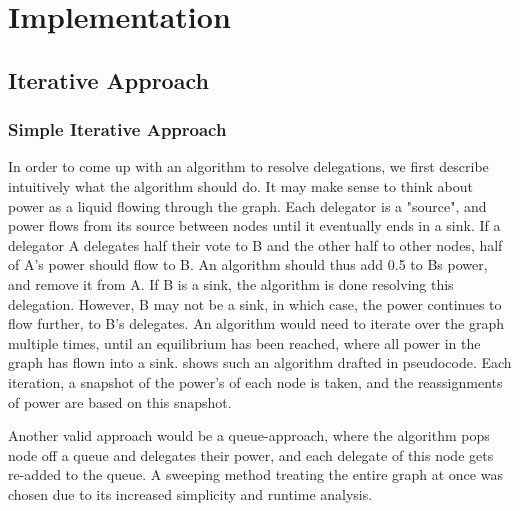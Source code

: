 \graphicspath{{./figures/}}

\chapter{Implementation}

\section{Iterative Approach}
\label{sec:iterative_approach}

\subsection{Simple Iterative Approach}

In order to come up with an algorithm to resolve delegations, we first describe intuitively what the algorithm should do. It may make sense to think about power as a liquid flowing through the graph. Each delegator is a "source", and power flows from its source between nodes until it eventually ends in a sink. If a delegator A delegates half their vote to B and the other half to other nodes, half of A's power should flow to B. An algorithm should thus add 0.5 to Bs power, and remove it from A. If B is a sink, the algorithm is done resolving this delegation. However,  B may not be a sink, in which case, the power continues to flow further, to B's delegates. An algorithm would need to iterate over the graph multiple times, until an equilibrium has been reached, where all power in the graph has flown into a sink.  shows such an algorithm drafted in pseudocode. Each iteration, a snapshot of the power's of each node is taken, and the reassignments of power are based on this snapshot\footnotemark.  


Another valid approach would be a queue-approach, where the algorithm pops node off a queue and delegates their power, and each delegate of this node gets re-added to the queue. A sweeping method treating the entire graph at once was chosen due to its increased simplicity and runtime analysis.

